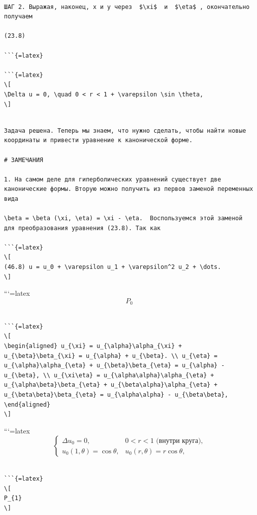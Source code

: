 \documentclass[
]{article}
\begin{document}
\begin{verbatim}

ШАГ 2. Выражая, наконец, x и y через  $\xi$  и  $\eta$ , окончательно получаем

(23.8)

```{=latex}

```{=latex}
\[
\Delta u = 0, \quad 0 < r < 1 + \varepsilon \sin \theta,
\]
\end{verbatim}

\begin{verbatim}

Задача решена. Теперь мы знаем, что нужно сделать, чтобы найти новые координаты и привести уравнение к канонической форме.

# ЗАМЕЧАНИЯ

1. На самом деле для гиперболических уравнений существует две канонические формы. Вторую можно получить из первов заменой переменных вида

\beta = \beta (\xi, \eta) = \xi - \eta.  Воспользуемся этой заменой для преобразования уравнения (23.8). Так как

```{=latex}
\[
(46.8) u = u_0 + \varepsilon u_1 + \varepsilon^2 u_2 + \dots.
\]
\end{verbatim}

```{=latex}
\[
P_{0}
\]

\begin{verbatim}

```{=latex}
\[
\begin{aligned} u_{\xi} = u_{\alpha}\alpha_{\xi} + u_{\beta}\beta_{\xi} = u_{\alpha} + u_{\beta}. \\ u_{\eta} = u_{\alpha}\alpha_{\eta} + u_{\beta}\beta_{\eta} = u_{\alpha} - u_{\beta}, \\ u_{\xi\eta} = u_{\alpha\alpha}\alpha_{\eta} + u_{\alpha\beta}\beta_{\eta} + u_{\beta\alpha}\alpha_{\eta} + u_{\beta\beta}\beta_{\eta} = u_{\alpha\alpha} - u_{\beta\beta}, \end{aligned}
\]
\end{verbatim}

```{=latex}
\[
\begin{cases} \Delta u_{0} = 0, & 0 < r < 1 \text{ (внутри круга),} \\ u_{0}(1, \theta) = \cos \theta, & u_{0}(r, \theta) = r \cos \theta, \end{cases}
\]

\begin{verbatim}

```{=latex}
\[
P_{1}
\]
\end{verbatim}
\end{document}
